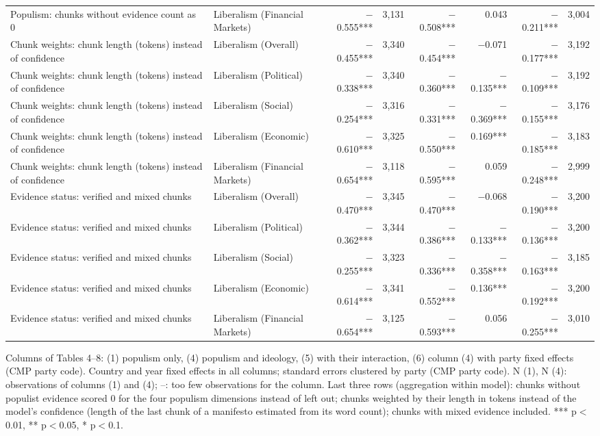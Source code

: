 \begin{table}[ht]
{\begin{tabular}{llrrrrrr}
Populism: chunks without evidence count as 0 & Liberalism (Financial Markets) & $-$0.555*** & 3,131 & $-$0.508*** & 0.043 & $-$0.211*** & 3,004 \\
Chunk weights: chunk length (tokens) instead of confidence & Liberalism (Overall) & $-$0.455*** & 3,340 & $-$0.454*** & $-$0.071 & $-$0.177*** & 3,192 \\
Chunk weights: chunk length (tokens) instead of confidence & Liberalism (Political) & $-$0.338*** & 3,340 & $-$0.360*** & $-$0.135*** & $-$0.109*** & 3,192 \\
Chunk weights: chunk length (tokens) instead of confidence & Liberalism (Social) & $-$0.254*** & 3,316 & $-$0.331*** & $-$0.369*** & $-$0.155*** & 3,176 \\
Chunk weights: chunk length (tokens) instead of confidence & Liberalism (Economic) & $-$0.610*** & 3,325 & $-$0.550*** & 0.169*** & $-$0.185*** & 3,183 \\
Chunk weights: chunk length (tokens) instead of confidence & Liberalism (Financial Markets) & $-$0.654*** & 3,118 & $-$0.595*** & 0.059 & $-$0.248*** & 2,999 \\
Evidence status: verified and mixed chunks & Liberalism (Overall) & $-$0.470*** & 3,345 & $-$0.470*** & $-$0.068 & $-$0.190*** & 3,200 \\
Evidence status: verified and mixed chunks & Liberalism (Political) & $-$0.362*** & 3,344 & $-$0.386*** & $-$0.133*** & $-$0.136*** & 3,200 \\
Evidence status: verified and mixed chunks & Liberalism (Social) & $-$0.255*** & 3,323 & $-$0.336*** & $-$0.358*** & $-$0.163*** & 3,185 \\
Evidence status: verified and mixed chunks & Liberalism (Economic) & $-$0.614*** & 3,341 & $-$0.552*** & 0.136*** & $-$0.192*** & 3,200 \\
Evidence status: verified and mixed chunks & Liberalism (Financial Markets) & $-$0.654*** & 3,125 & $-$0.593*** & 0.056 & $-$0.255*** & 3,010 \\
\bottomrule
\end{tabular}}
\par\smallskip
\begin{minipage}{\linewidth}\scriptsize Columns of Tables 4--8: (1) populism only, (4) populism and ideology, (5) with their interaction, (6) column (4) with party fixed effects (CMP party code). Country and year fixed effects in all columns; standard errors clustered by party (CMP party code). N (1), N (4): observations of columns (1) and (4); --: too few observations for the column. Last three rows (aggregation within model): chunks without populist evidence scored 0 for the four populism dimensions instead of left out; chunks weighted by their length in tokens instead of the model's confidence (length of the last chunk of a manifesto estimated from its word count); chunks with mixed evidence included. *** p$<$0.01, ** p$<$0.05, * p$<$0.1.\end{minipage}
\end{table}
